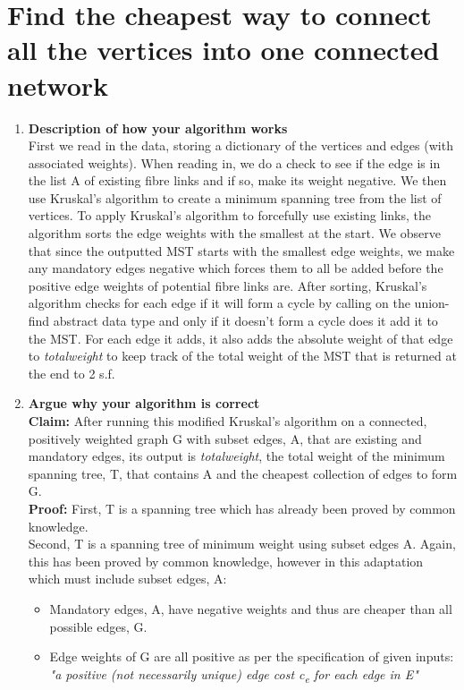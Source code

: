 \documentclass[11pt, oneside]{article}   	%
\begin{document}
\section{Find the cheapest way to connect all the vertices into one connected network}
\begin{enumerate}[label=(\alph*)]
\item{\textbf{Description of how your algorithm works}}\\
First we read in the data, storing a dictionary of the vertices and edges (with associated weights). When reading in, we do a check to see if the edge is in the list A of existing fibre links and if so, make its weight negative. We then use Kruskal's algorithm to create a minimum spanning tree from the list of vertices. To apply Kruskal's algorithm to forcefully use existing links, the algorithm sorts the edge weights with the smallest at the start. We observe that since the outputted MST starts with the smallest edge weights, we make any mandatory edges negative which forces them to all be added before the positive edge weights of potential fibre links are. After sorting, Kruskal's algorithm checks for each edge if it will form a cycle by calling on the union-find abstract data type and only if it doesn't form a cycle does it add it to the MST. For each edge it adds, it also adds the absolute weight of that edge to \textit{totalweight} to keep track of the total weight of the MST that is returned at the end to 2 s.f.
\item{\textbf{Argue why your algorithm is correct}}\\
\textbf{Claim: } After running this modified Kruskal's algorithm on a connected, positively weighted graph G with subset edges, A, that are existing and mandatory edges, its output is \textit{totalweight}, the total weight of the minimum spanning tree, T, that contains A and the cheapest collection of edges to form G.\\
\textbf{Proof: } First, T is a spanning tree which has already been proved by common knowledge.\\
Second, T is a spanning tree of minimum weight using subset edges A. Again, this has been proved by common knowledge, however in this adaptation which must include subset edges, A:
\begin{itemize}
\item Mandatory edges, A, have negative weights and thus are cheaper than all possible edges, G.
\item Edge weights of G are all positive as per the specification of given inputs: \textit{"a positive (not necessarily unique) edge cost c\textsubscript{e} for each edge in E"}

\end{itemize}
\end{enumerate}
\end{document}
